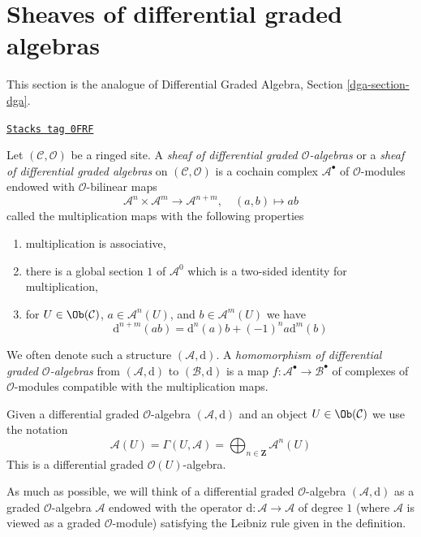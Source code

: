 \section{Sheaves of differential graded algebras}
\label{sdga-section-dga}
This section is the analogue of
Differential Graded Algebra, Section \ref{dga-section-dga}.

\begin{definition}[Dga]
\label{sdga-definition-dga}
\href{https://stacks.math.columbia.edu/tag/0FRF}{\texttt{Stacks tag 0FRF}}

Let $(\mathcal{C}, \mathcal{O})$ be a ringed site. A
{\it sheaf of differential graded $\mathcal{O}$-algebras}
or a {\it sheaf of differential graded algebras} on
$(\mathcal{C}, \mathcal{O})$ is a cochain complex
$\mathcal{A}^\bullet$ of $\mathcal{O}$-modules
endowed with $\mathcal{O}$-bilinear maps
$$
\mathcal{A}^n \times \mathcal{A}^m \to \mathcal{A}^{n + m},\quad
(a, b) \longmapsto ab
$$
called the multiplication maps with the following properties
\begin{enumerate}
\item multiplication is associative,
\item there is a global section $1$ of $\mathcal{A}^0$
which is a two-sided identity for multiplication,
\item for $U \in \Ob(\mathcal{C})$, $a \in \mathcal{A}^n(U)$, and
$b \in \mathcal{A}^m(U)$ we have
$$
\text{d}^{n + m}(ab) = \text{d}^n(a)b + (-1)^n a\text{d}^m(b)
$$
\end{enumerate}
We often denote such a structure $(\mathcal{A}, \text{d})$.
A {\it homomorphism of differential graded $\mathcal{O}$-algebras}
from $(\mathcal{A}, \text{d})$ to $(\mathcal{B}, \text{d})$ is a map
$f : \mathcal{A}^\bullet \to \mathcal{B}^\bullet$ of complexes
of $\mathcal{O}$-modules compatible with the multiplication maps.
\end{definition}

Given a differential graded $\mathcal{O}$-algebra $(\mathcal{A}, \text{d})$
and an object $U \in \Ob(\mathcal{C})$ we use the notation
$$
\mathcal{A}(U) =
\Gamma(U, \mathcal{A}) =
\bigoplus\nolimits_{n \in \mathbf{Z}} \mathcal{A}^n(U)
$$
This is a differential graded $\mathcal{O}(U)$-algebra.

\medskip\noindent
As much as possible, we will think of a differential graded
$\mathcal{O}$-algebra $(\mathcal{A}, \text{d})$
as a graded $\mathcal{O}$-algebra $\mathcal{A}$ endowed with
the operator $\text{d} : \mathcal{A} \to \mathcal{A}$ of degree $1$
(where $\mathcal{A}$ is viewed as a graded $\mathcal{O}$-module)
satisfying the Leibniz rule given in the definition.

